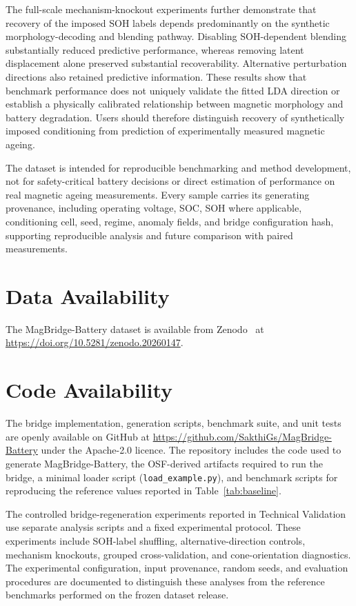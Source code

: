 \documentclass[11pt]{article}
\begin{document}
The full-scale mechanism-knockout experiments further
demonstrate that recovery of the imposed SOH labels
depends predominantly on the synthetic morphology-decoding
and blending pathway. Disabling SOH-dependent blending
substantially reduced predictive performance, whereas
removing latent displacement alone preserved substantial
recoverability. Alternative perturbation directions
also retained predictive information. These results
show that benchmark performance does not uniquely
validate the fitted LDA direction or establish a
physically calibrated relationship between magnetic
morphology and battery degradation. Users should
therefore distinguish recovery of synthetically imposed
conditioning from prediction of experimentally
measured magnetic ageing.

The dataset is intended for reproducible benchmarking and method development,
not for safety-critical battery decisions or direct estimation of performance
on real magnetic ageing measurements. Every sample carries its generating
provenance, including operating voltage, SOC, SOH where applicable,
conditioning cell, seed, regime, anomaly fields, and bridge configuration
hash, supporting reproducible analysis and future comparison with paired
measurements.

\section*{Data Availability}
The MagBridge-Battery dataset is available from Zenodo~\cite{gunasekar2026magbridge_dataset} at \url{https://doi.org/10.5281/zenodo.20260147}.

\section*{Code Availability}

The bridge implementation, generation scripts, benchmark suite, and unit
tests are openly available on GitHub at
\url{https://github.com/SakthiGs/MagBridge-Battery} under the Apache-2.0
licence. The repository includes the code used to generate
MagBridge-Battery, the OSF-derived artifacts required to run the
bridge, a minimal loader script (\texttt{load\_example.py}), and benchmark
scripts for reproducing the reference values reported in
Table~\ref{tab:baseline}.

The controlled bridge-regeneration experiments reported
in Technical Validation use separate analysis scripts
and a fixed experimental protocol. These experiments
include SOH-label shuffling, alternative-direction
controls, mechanism knockouts, grouped cross-validation,
and cone-orientation diagnostics. The experimental
configuration, input provenance, random seeds, and
evaluation procedures are documented to distinguish
these analyses from the reference benchmarks performed
on the frozen dataset release.
\end{document}
